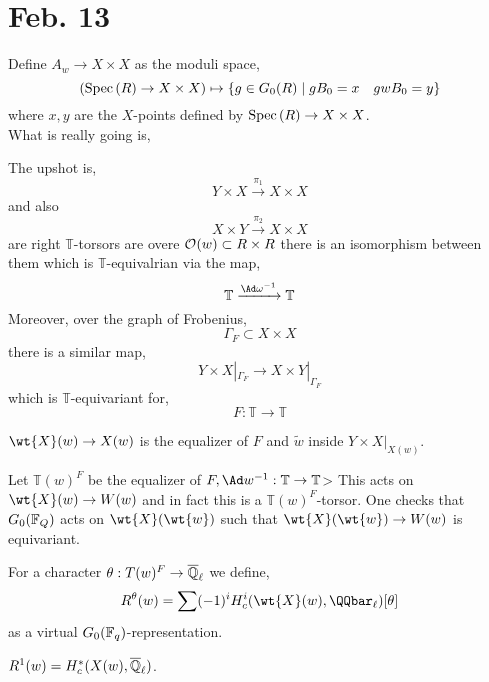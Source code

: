 \documentclass[12pt]{article}
\begin{document}
\section{Feb. 13}

\newcommand{\TT}{\mathbb{T}}

Define $A_w \to X \times X$ as the moduli space,
\[ (\mathrm{Spec}\left( R \right) \to X \times X) \mapsto \{ g \in G_0(R) \mid g B_0 = x \quad g w B_0 = y \} \]
where $x,y$ are the $X$-points defined by $\mathrm{Spec}\left( R \right) \to X \times X$. 
\bigskip\\
What is really going is,
\begin{center}
\end{center}
The upshot is,
\[ Y \times X \xrightarrow{\pi_1} X \times X \]
and also
\[ X \times Y \xrightarrow{\pi_2} X \times X \]
are right $\TT$-torsors are overe $\mathcal{O}_{}(w) \subset R \times R$ there is an isomorphism between them which is $\TT$-equivalrian via the map,
\[ \TT \xrightarrow{\Ad \omega^{-1}} \TT \]
Moreover, over the graph of Frobenius,
\[ \Gamma_F \subset X \times X \]
there is a similar map,
\[ Y \times X |_{\Gamma_F} \to X \times Y |_{\Gamma_F} \]
which is $\TT$-equivariant for,
\[ F : \TT \to \TT \]

\begin{defn}
$\wt{X}(w) \to X(w)$ is the equalizer of $F$ and $\tilde{w}$ inside $Y \times X |_{X(w)}$.
\end{defn}

Let $\TT(w)^F$ be the equalizer of $F, \Ad w^{-1} : \TT \to \TT$> This acts on $\wt{X}(w) \to W(w)$ and in fact this is a $\TT(w)^F$-torsor. One checks that $G_0(\mathbb{F}_Q)$ acts on $\wt{X}(\wt{w})$ such that $\wt{X}(\wt{w}) \to W(w)$ is equivariant. 

\begin{defn}
For a character $\theta : T(w)^F \to \overline{\mathbb{Q}}_\ell$ we define,
\[ R^\theta(w) = \sum (-1)^i H^i_c(\wt{X}(w), \QQbar_\ell)[\theta] \]
as a virtual $G_0(\mathbb{F}_q)$-representation.
\end{defn}

\begin{rmk}
$R^1(w) = H^*_c(X(w), \overline{\mathbb{Q}}_\ell)$.
\end{rmk}
\end{document}
